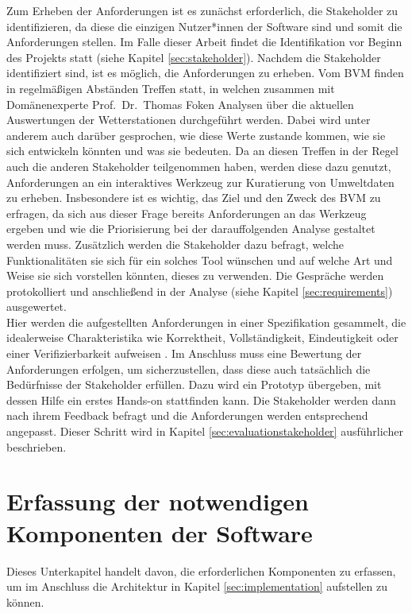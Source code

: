 Zum Erheben der Anforderungen ist es zunächst erforderlich, die Stakeholder zu identifizieren, da diese die einzigen Nutzer*innen der Software sind und somit die Anforderungen stellen. Im Falle dieser Arbeit findet die Identifikation vor Beginn des Projekts statt (siehe Kapitel \ref{sec:stakeholder}). Nachdem die Stakeholder identifiziert sind, ist es möglich, die Anforderungen zu erheben. Vom \ac{BVM} finden in regelmäßigen Abständen Treffen statt, in welchen zusammen mit Domänenexperte Prof.\ Dr.\ Thomas Foken Analysen über die aktuellen Auswertungen der Wetterstationen durchgeführt werden. Dabei wird unter anderem auch darüber gesprochen, wie diese Werte zustande kommen, wie sie sich entwickeln könnten und was sie bedeuten. Da an diesen Treffen in der Regel auch die anderen Stakeholder teilgenommen haben, werden diese dazu genutzt, Anforderungen an ein interaktives Werkzeug zur Kuratierung von Umweltdaten zu erheben. Insbesondere ist es wichtig, das Ziel und den Zweck des \ac{BVM} zu erfragen, da sich aus dieser Frage bereits Anforderungen an das Werkzeug ergeben und wie die Priorisierung bei der darauffolgenden Analyse gestaltet werden muss. Zusätzlich werden die Stakeholder dazu befragt, welche Funktionalitäten sie sich für ein solches Tool wünschen und auf welche Art und Weise sie sich vorstellen könnten, dieses zu verwenden. Die Gespräche werden protokolliert und anschließend in der Analyse (siehe Kapitel \ref{sec:requirements}) ausgewertet.\\ Hier werden die aufgestellten Anforderungen in einer Spezifikation gesammelt, die idealerweise Charakteristika wie Korrektheit, Vollständigkeit, Eindeutigkeit oder einer Verifizierbarkeit aufweisen \cite{institute1984ieee}. Im Anschluss muss eine Bewertung der Anforderungen erfolgen, um sicherzustellen, dass diese auch tatsächlich die Bedürfnisse der Stakeholder erfüllen. Dazu wird ein Prototyp übergeben, mit dessen Hilfe ein erstes Hands-on stattfinden kann. Die Stakeholder werden dann nach ihrem Feedback befragt und die Anforderungen werden entsprechend angepasst. Dieser Schritt wird in Kapitel \ref{sec:evaluationstakeholder} ausführlicher beschrieben. 

\section{Erfassung der notwendigen Komponenten der Software}
Dieses Unterkapitel handelt davon, die erforderlichen Komponenten zu erfassen, um im Anschluss die Architektur in Kapitel \ref{sec:implementation} aufstellen zu können.

